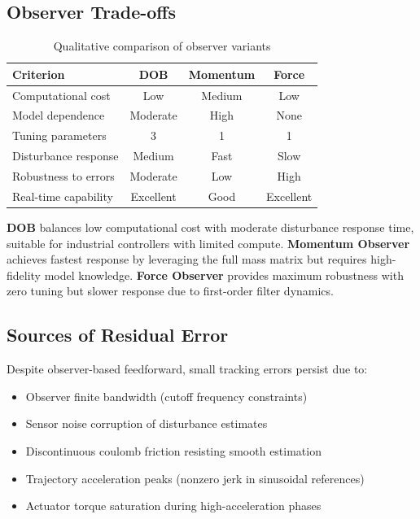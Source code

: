 \subsection{Observer Trade-offs}
\begin{table}[H]
    \centering
    \caption{Qualitative comparison of observer variants}
    \begin{tabular}{lccc}
        \toprule
        \textbf{Criterion} & \textbf{DOB} & \textbf{Momentum} & \textbf{Force} \\
        \midrule
        Computational cost & Low & Medium & Low \\
        Model dependence & Moderate & High & None \\
        Tuning parameters & 3 & 1 & 1 \\
        Disturbance response & Medium & Fast & Slow \\
        Robustness to errors & Moderate & Low & High \\
        Real-time capability & Excellent & Good & Excellent \\
        \bottomrule
    \end{tabular}
\end{table}

\textbf{DOB} balances low computational cost with moderate disturbance response time, suitable for industrial controllers with limited compute. \textbf{Momentum Observer} achieves fastest response by leveraging the full mass matrix but requires high-fidelity model knowledge. \textbf{Force Observer} provides maximum robustness with zero tuning but slower response due to first-order filter dynamics.

\subsection{Sources of Residual Error}
Despite observer-based feedforward, small tracking errors persist due to:
\begin{itemize}
    \item Observer finite bandwidth (cutoff frequency constraints)
    \item Sensor noise corruption of disturbance estimates
    \item Discontinuous coulomb friction resisting smooth estimation
    \item Trajectory acceleration peaks (nonzero jerk in sinusoidal references)
    \item Actuator torque saturation during high-acceleration phases
\end{itemize}

